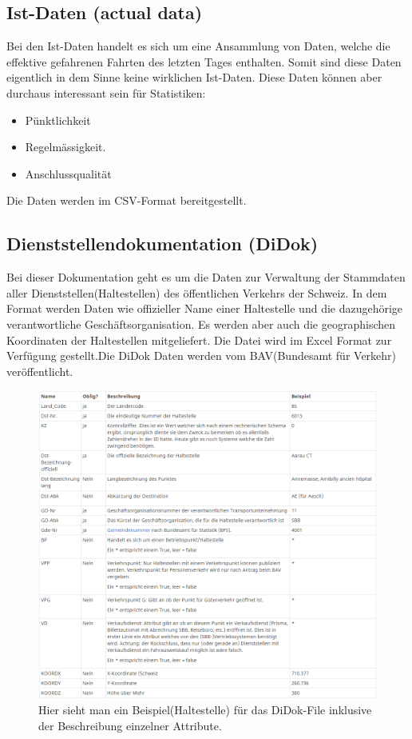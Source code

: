 \documentclass[a4paper,12pt]{scrartcl}
\begin{document}
\subsection{Ist-Daten (actual data)}
\label{sec:istdaten}
Bei den Ist-Daten handelt es sich um eine Ansammlung von Daten, welche die effektive gefahrenen Fahrten des letzten Tages enthalten. Somit sind diese Daten eigentlich in dem Sinne keine wirklichen Ist-Daten. Diese Daten können aber durchaus interessant sein für Statistiken:\cite{istdaten}
\begin{itemize}
	\item{Pünktlichkeit}   
	\item{Regelmässigkeit}. 
	\item{Anschlussqualität}  
\end{itemize}
Die Daten werden im CSV-Format bereitgestellt.

\subsection{Dienststellendokumentation (DiDok)}
\label{sec:didok}
Bei dieser Dokumentation geht es um die Daten zur Verwaltung der Stammdaten aller Dienststellen(Haltestellen) des öffentlichen Verkehrs der Schweiz. In dem Format werden Daten wie offizieller Name einer Haltestelle und die dazugehörige verantwortliche Geschäftsorganisation. Es werden aber auch die geographischen Koordinaten der Haltestellen mitgeliefert. Die Datei wird im Excel Format zur Verfügung gestellt.Die DiDok Daten werden vom BAV(Bundesamt für Verkehr) veröffentlicht. \cite{didok}

\begin{figure}[]
	\centering
	\includegraphics[width=15cm]{img/didokuebersicht.png}
	\caption{Hier sieht man ein Beispiel(Haltestelle) für das DiDok-File inklusive der Beschreibung einzelner Attribute.\cite{didok}}
	\label{fig:didok-uebersicht}
\end{figure}
\end{document}
